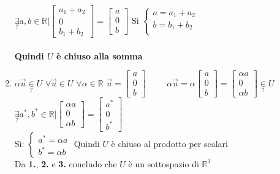 \begin{enumerate}
        $
        \underset{?}{\exists}a,b \in\mathbb{R}| 
        \begin{bmatrix}
            a_1+a_2\\
            0\\
            b_1+b_2
        \end{bmatrix}
        = 
        \begin{bmatrix}
            a\\0\\b
        \end{bmatrix}
        $
        Sì 
        $ 
        \begin{cases}
            a=a_1+a_2\\
            b=b_1+b_2\\
        \end{cases}
        $
        \\\\
        \textbf{Quindi $U$ è chiuso alla somma}
    \item $\alpha \vec{u} \underset{?}{\in} U$ $\forall\vec{u}\in U$ $\forall\alpha\in\mathbb{R}$
        $
        \vec{u}=
        \begin{bmatrix}
            a\\0\\b
        \end{bmatrix}
        \hspace{1cm}
        \alpha\vec{u}=\alpha
        \begin{bmatrix}
            a\\0\\b
        \end{bmatrix}
        = 
        \begin{bmatrix}
            \alpha a\\0\\\alpha b
        \end{bmatrix}
        \underset{?}{\in}U$         \\
        $ 
            \underset{?}{\exists}a^*, b^* \in\mathbb{R}\Big|
            \begin{bmatrix}
                \alpha a\\0\\ \alpha b
            \end{bmatrix}
            = 
            \begin{bmatrix}
                a^*\\0\\b^*
            \end{bmatrix}
        $\\
        Sì: $
        \begin{cases}
            a^* =\alpha a\\
            b^*=\alpha b
        \end{cases}
            $
        Quindi $U$ è chiuso al prodotto per scalari\\
        Da \textbf{1.}, \textbf{2.} e \textbf{3.} concludo che $U$ è 
        un sottospazio di $\mathbb{R}^3$
\end{enumerate} 
